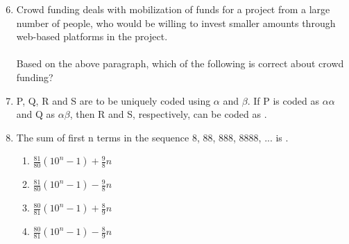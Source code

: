 \documentclass[12pt,onecolumn]{article}
\begin{document}
\begin{enumerate}
    \setcounter{enumi}{5}
    \item Crowd funding deals with mobilization of funds for a project from a large number of people, who would be willing to invest smaller amounts through web-based platforms in the project.\\\\Based on the above paragraph, which of the following is correct about crowd funding?
          \begin{enumerate}
          \end{enumerate}

    \item P, Q, R and S are to be uniquely coded using $\alpha$ and $\beta$. If P is coded as $\alpha\alpha$ and Q as $\alpha\beta$, then R and S, respectively, can be coded as \underline{\hspace{2cm}}.
          \begin{enumerate}
          \end{enumerate}

    \item The sum of first n terms in the sequence 8, 88, 888, 8888, ... is \underline{\hspace{2cm}}.
          \begin{enumerate}
              \item $\frac{81}{80}(10^n-1)+\frac{9}{8}n$
              \item $\frac{81}{80}(10^n-1)-\frac{9}{8}n$
              \item $\frac{80}{81}(10^n-1)+\frac{8}{9}n$
              \item $\frac{80}{81}(10^n-1)-\frac{8}{9}n$
          \end{enumerate}


\end{enumerate}
\end{document}
